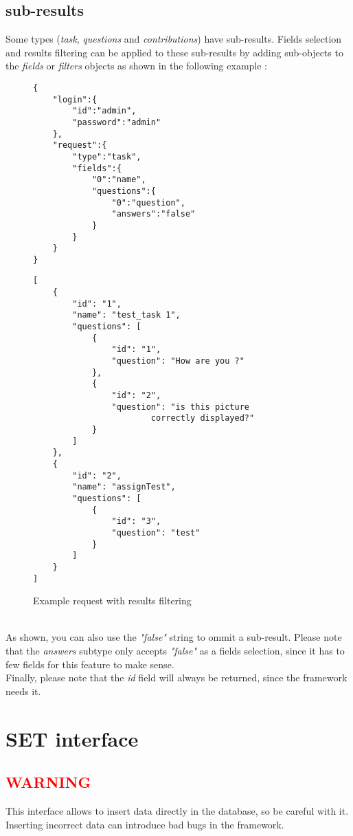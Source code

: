 \documentclass[notitlepage]{report}
\begin{document}
\section{sub-results}
Some types (\emph{task}, \emph{questions} and \emph{contributions}) have sub-results. Fields selection and results filtering can be applied to these sub-results by adding sub-objects to the \emph{fields} or \emph{filters} objects as shown in the following example :
\begin{figure}[h]
\centering
\begin{minipage}{.45\linewidth}
\begin{verbatim}
{
	"login":{	
		"id":"admin",
		"password":"admin"
	},
	"request":{
		"type":"task",
		"fields":{
			"0":"name",
			"questions":{
				"0":"question",
				"answers":"false"
			}
		}
	}
}
\end{verbatim}
\end{minipage}
\begin{minipage}{.45\linewidth}
\begin{verbatim}
[
    {
        "id": "1",
        "name": "test_task 1",
        "questions": [
            {
                "id": "1",
                "question": "How are you ?"
            },
            {
                "id": "2",
                "question": "is this picture 
                		correctly displayed?"
            }
        ]
    },
    {
        "id": "2",
        "name": "assignTest",
        "questions": [
            {
                "id": "3",
                "question": "test"
            }
        ]
    }
]
\end{verbatim}
\end{minipage}
\caption{Example request with results filtering}
\end{figure}
\\As shown, you can also use the \emph{"false"} string to ommit a sub-result. Please note that the \emph{answers} subtype only accepts \emph{"false"} as a fields selection, since it has to few fields for this feature to make sense. \\
Finally, please note that the \emph{id} field will always be returned, since the framework needs it.

\chapter{SET interface}
\section{\textcolor{red}{WARNING}}
This interface allows to insert data directly in the database, so be careful with it. Inserting incorrect data can introduce bad bugs in the framework.
\end{document}

